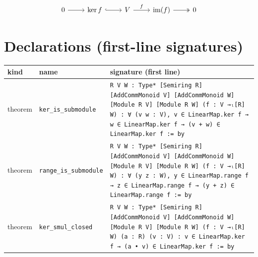 \documentclass[12pt]{article}
\begin{document}
\[
\begin{tikzcd}
0 \arrow[r] & \ker f \arrow[r, hook] & V \arrow[r, "f"] & \operatorname{im}(f) \arrow[r, two heads] & 0
\end{tikzcd}
\]

\section*{Declarations (first-line signatures)} 
\begin{center}
\begin{tabular}{lll}
\textbf{kind} & \textbf{name} & \textbf{signature (first line)} \\ \hline
theorem & \texttt{ker\_is\_submodule} & \texttt{{R V W : Type*} [Semiring R] [AddCommMonoid V] [AddCommMonoid W] [Module R V] [Module R W] (f : V →ₗ[R] W) : ∀ (v w : V), v ∈ LinearMap.ker f → w ∈ LinearMap.ker f → (v + w) ∈ LinearMap.ker f := by} \\
theorem & \texttt{range\_is\_submodule} & \texttt{{R V W : Type*} [Semiring R] [AddCommMonoid V] [AddCommMonoid W] [Module R V] [Module R W] (f : V →ₗ[R] W) : ∀ (y z : W), y ∈ LinearMap.range f → z ∈ LinearMap.range f → (y + z) ∈ LinearMap.range f := by} \\
theorem & \texttt{ker\_smul\_closed} & \texttt{{R V W : Type*} [Semiring R] [AddCommMonoid V] [AddCommMonoid W] [Module R V] [Module R W] (f : V →ₗ[R] W) (a : R) (v : V) : v ∈ LinearMap.ker f → (a • v) ∈ LinearMap.ker f := by} \\
\end{tabular}
\end{center}
\end{document}
